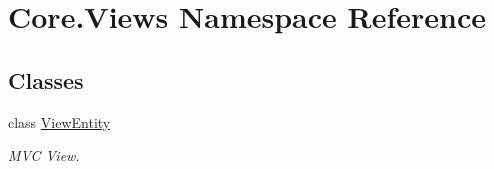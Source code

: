 \hypertarget{namespaceCore_1_1Views}{}\section{Core.\+Views Namespace Reference}
\label{namespaceCore_1_1Views}
\subsection*{Classes}
\begin{DoxyCompactItemize}
\item 
class \hyperlink{classCore_1_1Views_1_1ViewEntity}{View\+Entity}
\begin{DoxyCompactList}\small\item\em M\+V\+C View. \end{DoxyCompactList}\end{DoxyCompactItemize}
